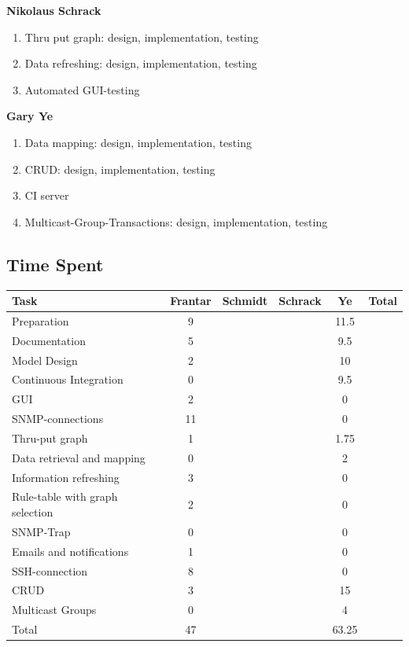 \documentclass[11pt, a4paper]{article}
\begin{document}
\noindent \textbf{Nikolaus Schrack}
\begin{enumerate}[noitemsep]
	\item Thru put graph: design, implementation, testing
	\item Data refreshing: design, implementation, testing
	\item Automated GUI-testing
\end{enumerate}

\noindent \textbf{Gary Ye}
\begin{enumerate}[noitemsep]
	\item Data mapping: design, implementation, testing
	\item CRUD: design, implementation, testing
	\item CI server
	\item Multicast-Group-Transactions: design, implementation, testing
\end{enumerate}

\subsection{Time Spent}
\begin{tabular} {| l | c | c | c | c | c |} \hline

	Task 								& 	Frantar 	& 	Schmidt 	& 	Schrack 	& 	Ye 		& 	Total 	\\ \hline \hline
	
	Preparation							& 	9			&				&				&	11.5	&			\\ \hline
	Documentation						&	5			&				&				&	9.5		&			\\ \hline
	Model Design						& 	2			&				&				& 	10		&			\\ \hline
	Continuous Integration				& 	0			& 				& 				&	9.5		&			\\ \hline \hline
		
	GUI									& 	2			&				&				& 	0		&			\\ \hline
	SNMP-connections					& 	11			&				&				& 	0		&			\\ \hline
	Thru-put graph						& 	1			&				&				& 	1.75	&			\\ \hline
	Data retrieval and mapping			& 	0			&				&				& 	2		&			\\ \hline
	Information refreshing				&	3			&				&				&	0		&			\\ \hline
	Rule-table with graph selection		&	2			&				&				&	0		&			\\ \hline \hline
	
	SNMP-Trap							&	0			&				&				&	0		&			\\ \hline
	Emails and notifications			&	1			&				&				&	0		&			\\ \hline
	SSH-connection						&	8			&				&				&	0		&			\\ \hline
	CRUD								& 	3			& 				& 				&	15		&			\\ \hline
	Multicast Groups					&	0			&				&				&	4		&			\\ \hline \hline
	
	Total								&	47			&				&				&	63.25	&			\\ \hline
	
\end{tabular}
\end{document}
